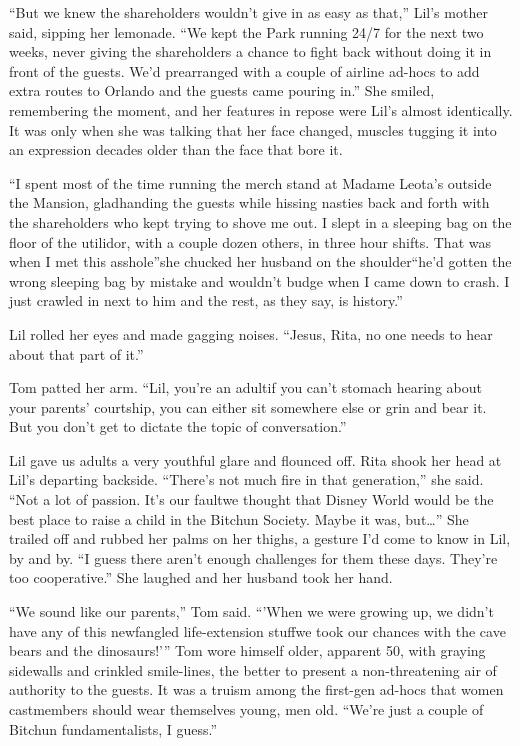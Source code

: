“But we knew the shareholders wouldn't give in as easy as that,”
Lil's mother said, sipping her lemonade. “We kept the Park running
24/7 for the next two weeks, never giving the shareholders a chance
to fight back without doing it in front of the guests. We'd
prearranged with a couple of airline ad-hocs to add extra routes to
Orlando and the guests came pouring in.” She smiled, remembering
the moment, and her features in repose were Lil's almost
identically. It was only when she was talking that her face
changed, muscles tugging it into an expression decades older than
the face that bore it.

“I spent most of the time running the merch stand at Madame Leota's
outside the Mansion, gladhanding the guests while hissing nasties
back and forth with the shareholders who kept trying to shove me
out. I slept in a sleeping bag on the floor of the utilidor, with a
couple dozen others, in three hour shifts. That was when I met this
asshole”{\dash}she chucked her husband on the shoulder{\dash}“he'd gotten the
wrong sleeping bag by mistake and wouldn't budge when I came down
to crash. I just crawled in next to him and the rest, as they say,
is history.”

Lil rolled her eyes and made gagging noises. “Jesus, Rita, no one
needs to hear about that part of it.”

Tom patted her arm. “Lil, you're an adult{\dash}if you can't stomach
hearing about your parents' courtship, you can either sit somewhere
else or grin and bear it. But you don't get to dictate the topic of
conversation.”

Lil gave us adults a very youthful glare and flounced off. Rita
shook her head at Lil's departing backside. “There's not much fire
in that generation,” she said. “Not a lot of passion. It's our
fault{\dash}we thought that Disney World would be the best place to raise
a child in the Bitchun Society. Maybe it was, but…” She trailed off
and rubbed her palms on her thighs, a gesture I'd come to know in
Lil, by and by. “I guess there aren't enough challenges for them
these days. They're too cooperative.” She laughed and her husband
took her hand.

“We sound like our parents,” Tom said. “'When we were growing up,
we didn't have any of this newfangled life-ex\-ten\-sion stuff{\dash}we took
our chances with the cave bears and the dinosaurs!'” Tom wore
himself older, apparent 50, with graying sidewalls and crinkled
smile-lines, the better to present a non-threatening air of
authority to the guests. It was a truism among the first-gen
ad-hocs that women castmembers should wear themselves young, men
old. “We're just a couple of Bitchun fundamentalists, I guess.”

